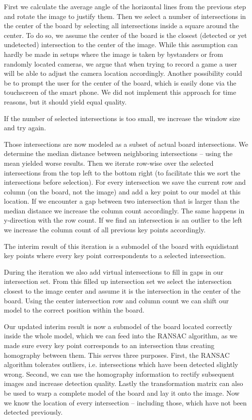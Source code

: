 	First we calculate the average angle of the horizontal lines from the previous step and rotate the image to justify them. Then we select a number of intersections in the center of the board by selecting all intersections inside a square around the center. To do so, we assume the center of the board is the closest (detected or yet undetected) intersection to the center of the image. While this assumption can hardly be made in setups where the image is taken by bystanders or from randomly located cameras, we argue that when trying to record a game a user will be able to adjust the camera location accordingly. Another possibility could be to prompt the user for the center of the board, which is easily done via the touchscreen of the smart phone. We did not implement this approach for time reasons, but it should yield equal quality.

	If the number of selected intersections is too small, we increase the window size and try again.

	Those intersections are now modeled as a subset of actual board intersections. We determine the median distance between neighboring intersections -- using the mean yielded worse results. Then we iterate row-wise over the selected intersections from the top left to the bottom right (to facilitate this we sort the intersections before selection). For every intersection we save the current row and column (on the board, not the image) and add a key point to our model at this location. If we encounter a gap between two intersection that is larger than the median distance we increase the column count accordingly. The same happens in y-direction with the row count. If we find an intersection is an outlier to the left we increase the column count of all previous key points accordingly.

	The interim result of this iteration is a submodel of the board with equidistant key points where every key point correspondents to a selected intersection.

	During the iteration we also add virtual intersections to fill in gaps in our intersection set. From this filled up intersection set we select the intersection closest to the image center and assume it is the intersection in the center of the board. Using the center intersection row and column count we can shift our model to the correct position within the board.

	Our updated interim result is now a submodel of the board located correctly inside the whole model, which we can feed into the RANSAC algorithm, as we made sure every key point corresponds to an intersection thus creating homography between them. This serves three purposes. First, the RANSAC algorithm tolerates outliers, i.e. intersections which have been detected slightly wrong. Second, we can use the homography information to rectify subsequent images and increase detection quality. Lastly the transformation matrix can also be used to warp a complete model of the board and lay it onto the image. Now we know the location of every intersection -- including those, which have not been detected previously.

